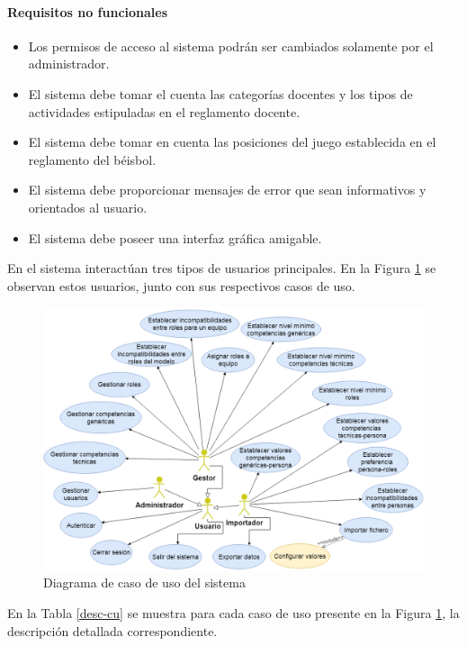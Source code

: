 \paragraph{Requisitos no funcionales}
\begin{itemize}
	\item Los permisos de acceso al sistema podrán ser cambiados solamente por el administrador.
	\item El sistema debe tomar el cuenta las categorías docentes y los tipos de actividades estipuladas en el reglamento docente.
	\item El sistema debe tomar en cuenta las posiciones del juego establecida en el reglamento del béisbol.
	\item El sistema debe proporcionar mensajes de error que sean informativos y orientados al usuario.
	\item El sistema debe poseer una interfaz gráfica amigable.
\end{itemize}

En el sistema interactúan tres tipos de usuarios principales. En la Figura \ref{fig:cu-sistema} se observan estos usuarios, junto con sus respectivos casos de uso.

\begin{figure}[H]
	\hspace{-0.5cm}
	\includegraphics[width=1.1\textwidth]{figuras/DiagramaCUPP3.png}
	\caption{Diagrama de caso de uso del sistema}\label{fig:cu-sistema}
\end{figure}

En la Tabla \ref{desc-cu} se muestra para cada caso de uso presente en la Figura \ref{fig:cu-sistema}, la descripción detallada correspondiente.

